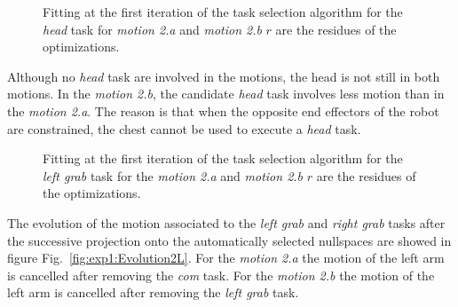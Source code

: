 \documentclass[letterpaper, 10pt, conference]{ieeeconf}      %
\begin{document}

\begin{figure}[t]
  \centering
  \subfigure[Motion 2.a]{
  \resizebox{.48\textwidth}{!} {
  
  }
  \label{fig:exp1:headFit:R}
  }
  \subfigure[Motion 2.b]{
  \resizebox{.48\textwidth}{!} {
  
  }
  \label{fig:exp1:headFit:RL}
  }
  \caption{Fitting at the first iteration of the task selection algorithm
  for the \emph{head} task for \emph{motion 2.a} and \emph{motion 2.b} 
  $r$ are the residues of the optimizations.}
  \label{fig:exp1:headFit}
\end{figure}

Although no \emph{head} task are involved in the motions, the head is not still in both motions.  
In the \emph{motion 2.b}, the candidate \emph{head} task involves less motion
than in the \emph{motion 2.a}. The reason is that when the opposite end effectors
of the robot are constrained, the chest cannot be used to execute a \emph{head} task.

\begin{figure}[t]
  \centering
  \subfigure[Motion 2.a]{
  \resizebox{.48\textwidth}{!} {
  
  }                           
  \label{fig:exp1:taskLhand:R}
  }
  \subfigure[Motion 2.b]{
  \resizebox{.48\textwidth}{!} {
  
  }
  \label{fig:exp1:taskLhand:RL}
  }
  \caption{Fitting at the first iteration of the task selection algorithm
  for the \emph{left grab} task for the \emph{motion 2.a} and \emph{motion 2.b} 
  $r$ are the residues of the optimizations.}
  \label{fig:exp1:taskLhand}
\end{figure}

The evolution of the motion associated to the \emph{left grab} and \emph{right grab}
tasks after the successive projection onto the automatically selected nullspaces
are showed in figure Fig.~\ref{fig:exp1:Evolution2L}. For the \emph{motion 2.a}
the motion of the left arm is cancelled after removing the \emph{com} task.
For the \emph{motion 2.b} the motion of the left arm is cancelled after
removing the \emph{left grab} task.
\end{document}
